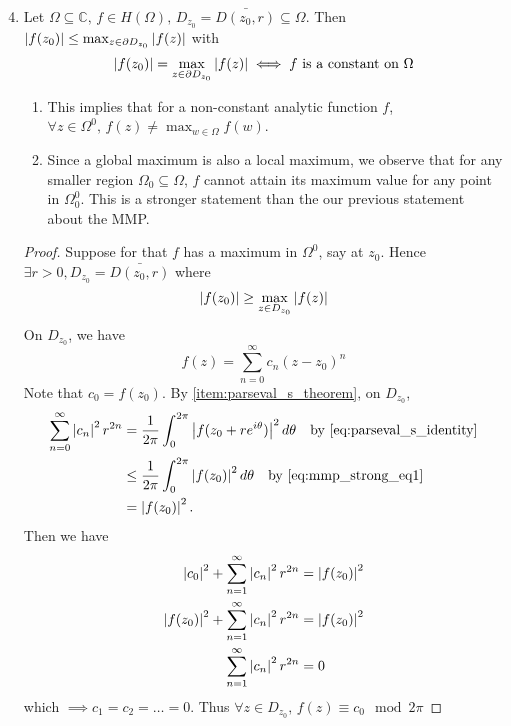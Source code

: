 \documentclass[11pt, oneside]{book}
\begin{document}
\begin{enumerate}
	\setcounter{enumi}{3}
	\item {} Let $\Omega \subseteq \mathbb{C}, \, f \in H(\Omega), \, D_{z_0} = \bar{D(z_0, r)} \subseteq \Omega$. Then $\left|f(z_0)\right| \leq \max_{z \in \partial D_{z_0}} \left|f(z)\right|$ with \label{item:maximum_modulus_principle_strong}
	\begin{equation*}
		\left|f(z_0)\right| = \max_{z \in \partial D_{z_0}} \left|f(z)\right| \iff f \text{ is a constant on } \Omega
	\end{equation*}

	\begin{remark}
		\begin{enumerate}
			\item This implies that for a non-constant analytic function $f$, $\forall z \in \Omega^0, \, f(z) \neq \max_{w \in \Omega} f(w)$.
			\item Since a global maximum is also a local maximum, we observe that for any smaller region $\Omega_0 \subseteq \Omega$, $f$ cannot attain its maximum value for any point in $\Omega_0^0$. This is a stronger statement than the our previous statement about the MMP.
		\end{enumerate}
	\end{remark}

	\begin{proof}
		Suppose for \Lightning that $f$ has a maximum in $\Omega^0$, say at $z_0$. Hence $\exists r > 0, D_{z_0} = \bar{D(z_0, r)}$ where
		\begin{equation*}
			\left|f(z_0)\right| \geq \max_{z \in D_{z_0}} \left|f(z)\right|
		\end{equation*}
		On $D_{z_0}$, we have
		\begin{equation}\label{eq:mmp_strong_eq1}
			f(z) = \sum_{n=0}^{\infty} c_n (z - z_0)^n
		\end{equation}
		Note that $c_0 = f(z_0)$. By \cref{item:parseval_s_theorem}, on $D_{z_0}$,
		\begin{align*}
			\sum_{n=0}^{\infty} \abs{c_n}^2 r^{2n}
				&= \frac{1}{2 \pi} \int_{0}^{2 \pi} \abs{f(z_0 + re^{i \theta})}^2 \dif{\theta} \quad \text{by } \cref{eq:parseval_s_identity} \\
				&\leq \frac{1}{2 \pi} \int_{0}^{2 \pi} \abs{f(z_0)}^2 \dif{\theta} \quad \text{by } \cref{eq:mmp_strong_eq1} \\
				&= \abs{f(z_0)}^2.
		\end{align*}
		Then we have
		\begin{align*}
			\left|c_0\right|^2 + \sum_{n=1}^{\infty} \left|c_n\right|^2 r^{2n}
				&= \left|f(z_0)\right|^2 \\
			\left|f(z_0)\right|^2 + \sum_{n=1}^{\infty} \left|c_n\right|^2 r^{2n}
				&= \left|f(z_0)\right|^2 \\
			\sum_{n=1}^{\infty} \left|c_n\right|^2 r^{2n} &= 0
		\end{align*}
		which $\implies c_1 = c_2 = \hdots = 0$. Thus $\forall z \in D_{z_0}, \, f(z) \equiv c_0 \mod 2 \pi$
 	\end{proof}
\end{enumerate}




\end{document}
